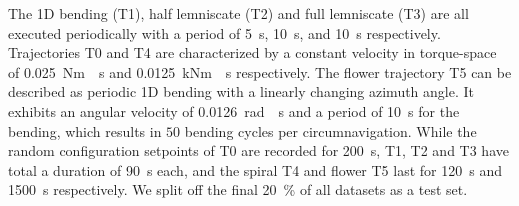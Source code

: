 The 1D bending (T1), half lemniscate (T2) and full lemniscate (T3) are all executed periodically with a period of \SI{5}{s}, \SI{10}{s}, and \SI{10}{s} respectively. 
Trajectories T0 and T4 are characterized by a constant velocity in torque-space of \SI{0.025}{Nm \per s} and \SI{0.0125}{kNm \per s} respectively.
The flower trajectory T5 can be described as periodic 1D bending with a linearly changing azimuth angle. It exhibits an angular velocity of \SI{0.0126}{rad \per s} and a period of \SI{10}{s} for the bending, which results in $50$ bending cycles per circumnavigation.
While the random configuration setpoints of T0 are recorded for \SI{200}{s}, T1, T2 and T3 have total a duration of \SI{90}{s} each, and the spiral T4 and flower T5 last for \SI{120}{s} and \SI{1500}{s} respectively.
We split off the final \SI{20}{\percent} of all datasets as a test set.



